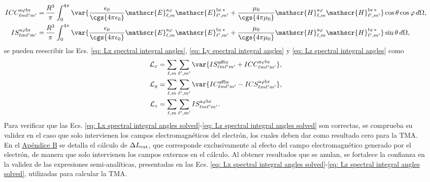 \begin{align}
%
ICC_{\ell m \ell^{\prime} m^{\prime}}^{\rm a \varphi b r}
 =& \, \frac{R^3}{\pi} \int_0^{4\pi}\var{\frac{\epsilon_0}{\cgs{4\pi\epsilon_0}}\mathscr{E}_{\ell, m}^{\text{a}\varphi}\mathscr{E}_{\ell^{\prime}, m^{\prime}}^{\text{br}\,*} + \frac{\mu_0}{\cgs{4\pi\mu_0}}\mathscr{H}_{\ell, m}^{\text{a}\varphi}\mathscr{H}_{\ell^{\prime}, m^{\prime}}^{\text{br}\,*}}\cos\theta\cos\varphi \, d\Omega, \\
%
%
%
IS_{\ell m \ell^{\prime} m^{\prime}}^{\rm a \varphi b r}
 =& \, \frac{R^3}{\pi} \int_0^{4\pi}\var{\frac{\epsilon_0}{\cgs{4\pi\epsilon_0}}\mathscr{E}_{\ell, m}^{\text{a}\varphi}\mathscr{E}_{\ell^{\prime}, m^{\prime}}^{\text{br}\,*} + \frac{\mu_0}{\cgs{4\pi\mu_0}}\mathscr{H}_{\ell, m}^{\text{a}\varphi}\mathscr{H}_{\ell^{\prime}, m^{\prime}}^{\text{br}\,*}}\sin\theta \, d\Omega ,
\end{align}
\vspace{-0.3 cm}
se pueden reescribir las Ecs. \eqref{eq: Lx spectral integral angles}, \eqref{eq: Ly spectral integral angles} y \eqref{eq: Lz spectral integral angles} como 
%
\begin{align}
\mathcal{L}_x &= 
\sum_{\ell, m} \sum_{\ell^{\prime}, m^{\prime}} 
\var{IS_{\ell m \ell^{\prime} m^{\prime}}^{\rm a \theta b r} + 
ICC_{\ell m \ell^{\prime} m^{\prime}}^{\rm a \varphi b r}}, \label{eq: Lx spectral integral angles solved} \\
% 
\mathcal{L}_y &= 
\sum_{\ell, m} \sum_{\ell^{\prime}, m^{\prime}}
\var{IC_{\ell m \ell^{\prime} m^{\prime}}^{\rm a \theta b r} - 
ICS_{\ell m \ell^{\prime} m^{\prime}}^{\rm a \varphi b r}}, \label{eq: Ly spectral integral angles solved} \\
%
\mathcal{L}_z &= 
\sum_{\ell, m} \sum_{\ell^{\prime}, m^{\prime}}
IS_{\ell m \ell^{\prime} m^{\prime}}^{\rm a \varphi b r}. \label{eq: Lz spectral integral angles solved}
\end{align}
%
Para verificar que las Ecs. \eqref{eq: Lx spectral integral angles solved}-\eqref{eq: Lz spectral integral angles solved} son correctas, se comprueba su validez en el caso que solo intervienen los campos electromagnéticos del electrón, los cuales deben dar como resultado cero para la TMA. En el \hyperref[AppendixAMTextField]{Apéndice B} se detalla el cálculo de $\Delta L_{\rm ext}$, que corresponde exclusivamente al efecto del campo electromagnético generado por el electrón, de manera que solo intervienen los campos externos en el cálculo. Al obtener resultados que se anulan, se fortalece la confianza en la validez de las expresiones semi-analíticas, presentadas en las Ecs. \eqref{eq: Lx spectral integral angles solved}-\eqref{eq: Lz spectral integral angles solved}, utilizadas para calcular la TMA.

